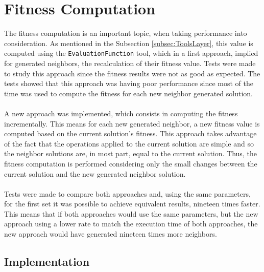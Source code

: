 \section{Fitness Computation}
\label{sec:FitnessComputation}

The fitness computation is an important topic, when taking performance into consideration. As mentioned in the Subsection \ref{subsec:ToolsLayer}, this value is computed using the \verb+EvaluationFunction+ tool, which in a first approach, implied for generated neighbors, the recalculation of their fitness value. Tests were made to study this approach since the fitness results were not as good as expected. The tests showed that this approach was having poor performance since most of the time was used to compute the fitness for each new neighbor generated solution.\\
\\
A new approach was implemented, which consists in computing the fitness incrementally. This means for each new generated neighbor, a new fitness value is computed based on the current solution's fitness. This approach takes advantage of the fact that the operations applied to the current solution are simple and so the neighbor solutions are, in most part, equal to the current solution. Thus, the fitness computation is performed considering only the small changes between the current solution and the new generated neighbor solution.\\
\\
Tests were made to compare both approaches and, using the same parameters, for the first set it was possible to achieve equivalent results, nineteen times faster. This means that if both approaches would use the same parameters, but the new approach using a lower rate to match the execution time of both approaches, the new approach would have generated nineteen times more neighbors.

\subsection{Implementation}

